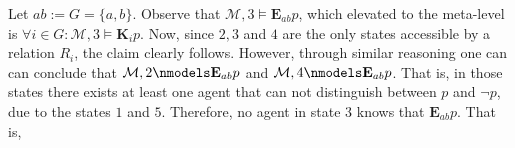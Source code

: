 \documentclass[11pt,a4paper]{article}
\newcommand{\eall}{\mathbf{K}}
\newcommand{\egen}{\mathbf{E}}
\begin{document}
\begin{itemize}
\begin{center}
\begin{tikzpicture}
\end{tikzpicture}
\end{center}
Let $ab:= G = \{a,b\}$. Observe that $\mathcal{M},3 \models \egen_{ab} p$, which elevated to the meta-level is $\forall i \in G : \mathcal{M},3 \models \eall_i p$. Now, since $2, 3$ and $4$ are the only states accessible by a relation $R_i$, the claim clearly follows. However, through similar reasoning one can can conclude that  $\mathcal{M},2 \nmodels \egen_{ab} p$ and $\mathcal{M},4 \nmodels \egen_{ab} p$. That is, in those states there exists at least one agent that can not distinguish between $p$ and $\neg p$, due to the states $1$ and $5$. Therefore, no agent in state $3$ knows that $ \egen_{ab} p$. That is, 
\begin{center}
\end{center}
\end{itemize}
\end{document}
